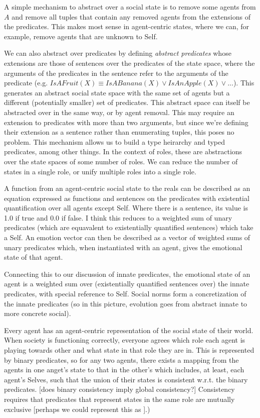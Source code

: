 \documentclass[a4paper]{article}
\begin{document}
A simple mechanism to abstract over a social state is to remove some agents from $A$ and remove all tuples that contain any removed agents from the extensions of the predicates. This makes most sense in agent-centric states, where we can, for example, remove agents that are unknown to Self.

We can also abstract over predicates by defining \textit{abstract predicates} whose extensions are those of sentences over the predicates of the state space, where the arguments of the predicates in the sentence refer to the arguments of the predicate (e.g. $IsAFruit(X) \equiv IsABanana(X) \vee IsAnApple(X) \vee ...$). This generates an abstract social state space with the same set of agents but a different (potentially smaller) set of predicates. This abstract space can itself be abstracted over in the same way, or by agent removal. This may require an extension to predicates with more than two arguments, but since we're defining their extension as a sentence rather than enumerating tuples, this poses no problem. This mechanism allows us to build a type heirarchy and typed predicates, among other things. In the context of roles, these are abstractions over the state spaces of some number of roles. We can reduce the number of states in a single role, or unify multiple roles into a single role.

A function from an agent-centric social state to the reals can be described as an equation expressed as functions and sentences on the predicates with existential quantification over all agents except Self. Where there is a sentence, its value is 1.0 if true and 0.0 if false. I think this reduces to a weighted sum of unary predicates (which are equavalent to existentially quantified sentences) which take a Self. An emotion vector can then be described as a vector of weighted sums of unary predicates which, when instantiated with an agent, gives the emotional state of that agent.

Connecting this to our discussion of innate predicates, the emotional state of an agent is a weighted sum over (existentially quantified sentences over) the innate predicates, with special reference to Self. Social norms form a concretization of the innate predicates (so in this picture, evolution goes from abstract innate to more concrete social).

Every agent has an agent-centric representation of the social state of their world. When society is functioning correctly, everyone agrees which role each agent is playing towards other and what state in that role they are in. This is represented by binary predicates, so for any two agents, there exists a mapping from the agents in one anget's state to that in the other's which includes, at least, each agent's Selves, such that the union of their states is consistent w.r.t. the binary predicates. [does binary consistency imply global consistency?] Consistency requires that predicates that represent states in the same role are mutually exclusive [perhaps we could represent this as ].)
\end{document}
